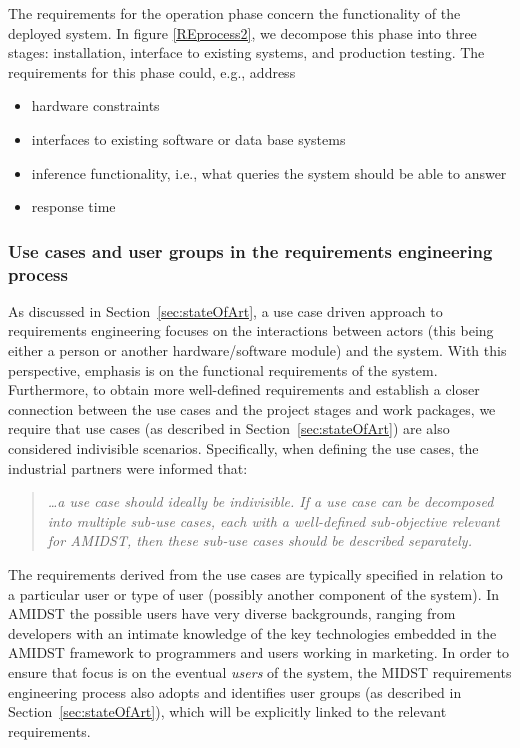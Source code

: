 The requirements for the operation phase concern the functionality of the deployed system. In figure \ref{REprocess2}, we decompose this phase into three stages: installation, interface to existing systems, and production testing. The requirements for this phase could, e.g., address
\begin{itemize}
 \item hardware constraints
 \item interfaces to existing software or data base systems
 \item inference functionality, i.e., what queries the system should be able to answer
 \item response time
\end{itemize}


\subsubsection{Use cases and user groups in the requirements engineering process}

As discussed in Section~\ref{sec:stateOfArt}, a use case driven approach to requirements engineering focuses on the
interactions between actors (this being either a person or another hardware/software module) and the system. With this
perspective, emphasis is on the functional requirements of the system. Furthermore, to obtain more well-defined
requirements and establish a closer connection
between the use cases and the project stages and work packages, we require that use cases (as described in
Section~\ref{sec:stateOfArt}) are also considered indivisible scenarios. Specifically, when defining the use cases,
the industrial partners were informed that:

\begin{quote}
\emph{  \ldots a use case should ideally be indivisible. If a use case can be decomposed into multiple
  sub-use cases, each with a well-defined sub-objective relevant for AMIDST, then these sub-use cases should be
  described separately.}
\end{quote}

The requirements derived from the use cases are typically specified in relation to a particular user or type of user (possibly another
component of the system). In AMIDST the possible users have very diverse backgrounds, ranging from developers with an
intimate knowledge of the key technologies embedded in the AMIDST framework to programmers and users working in
marketing. In order to ensure that focus is on the eventual \emph{users} of the system, the MIDST requirements
engineering process also adopts and identifies user groups (as described in Section~\ref{sec:stateOfArt}), which will be
explicitly linked to the relevant requirements.


